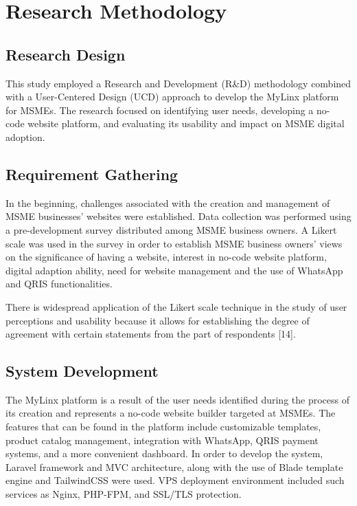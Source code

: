 \documentclass[conference]{IEEEtran}
\begin{document}

\section{Research Methodology}
\subsection{Research Design}
This study employed a Research and Development (R\&D) methodology combined with a User-Centered Design (UCD) approach to develop the MyLinx platform for MSMEs. The research focused on identifying user needs, developing a no- code website platform, and evaluating its usability and impact on MSME digital adoption.


\subsection{Requirement Gathering}
In the beginning, challenges associated with the creation and management of MSME businesses' websites were established. Data collection was performed using a pre-development survey distributed among MSME business owners. A Likert scale was used in the survey in order to establish MSME business owners' views on the significance of having a website, interest in no-code website platform, digital adaption ability, need for website management and the use of WhatsApp and QRIS functionalities.

There is widespread application of the Likert scale technique in the study of user perceptions and usability because it allows for establishing the degree of agreement with certain statements from the part of respondents [14].

\subsection{System Development}
The MyLinx platform is a result of the user needs identified during the process of its creation and represents a no-code website builder targeted at MSMEs. The features that can be found in the platform include customizable templates, product catalog management, integration with WhatsApp, QRIS payment systems, and a more convenient dashboard. In order to develop the system, Laravel framework and MVC architecture, along with the use of Blade template engine and TailwindCSS were used. VPS deployment environment included such services as Nginx, PHP-FPM, and SSL/TLS protection.
\end{document}
